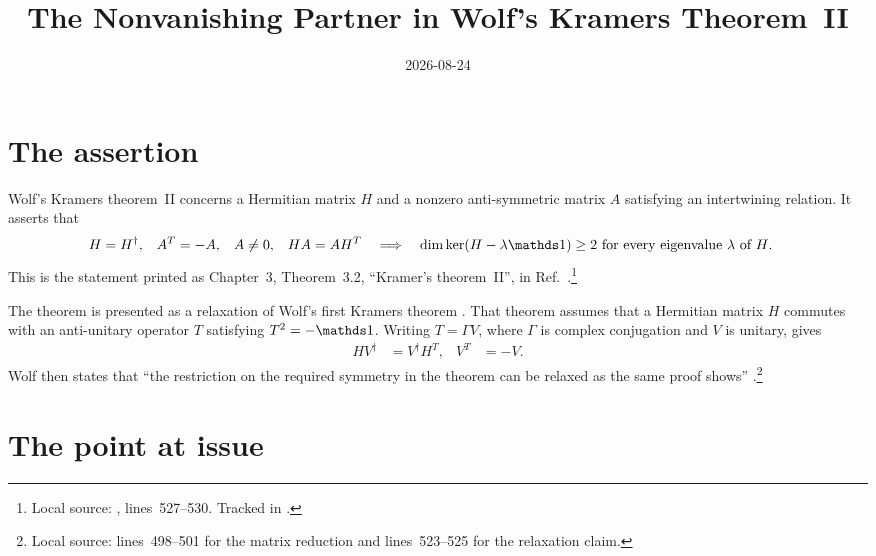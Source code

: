 \documentclass{article}
\title{The Nonvanishing Partner in Wolf's Kramers Theorem~II}
\author{}
\date{2026-08-24}
\begin{document}
\maketitle
{}

\section{The assertion}

Wolf's Kramers theorem~II concerns a Hermitian matrix $H$ and a nonzero
anti-symmetric matrix $A$ satisfying an intertwining relation. It asserts that
\begin{align}
    H&=H^\dagger,
    &
    A^T&=-A,
    &
    A&\neq 0,
    &
    HA&=AH^T
    \quad\Longrightarrow\quad
    \dim\ker(H-\lambda\Id)\geq 2
    \ \text{for every eigenvalue $\lambda$ of $H$}.
    \label{eq:wolf_ch3_kramers_theorem_ii_printed_claim}
\end{align}
This is the statement printed as Chapter~3, Theorem~3.2, ``Kramer's
theorem~II'', in Ref.~\cite{Wolf2012Quantum}.\footnote{Local source:
,
lines~527--530. Tracked in .}

The theorem is presented as a relaxation of Wolf's first Kramers theorem
\cite[Chapter~3, Theorem~3.1]{Wolf2012Quantum}. That theorem assumes that a
Hermitian matrix $H$ commutes with an anti-unitary operator $T$ satisfying
$T^2=-\Id$. Writing $T=\Gamma V$, where $\Gamma$ is complex conjugation and
$V$ is unitary, gives
\begin{align}
    HV^\dagger&=V^\dagger H^T,
    &
    V^T&=-V.
    \label{eq:wolf_ch3_kramers_theorem_ii_first_theorem_matrix_form}
\end{align}
Wolf then states that ``the restriction on the required symmetry in the
theorem can be relaxed as the same proof shows''
\cite[Chapter~3, Theorems~3.1--3.2]{Wolf2012Quantum}.\footnote{Local source:
lines~498--501 for the matrix reduction and lines~523--525 for the relaxation
claim.}

\section{The point at issue}
\end{document}
